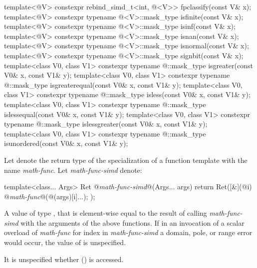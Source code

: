 \begin{itemdecl}
template<@\mathfloatingpoint@ V> constexpr rebind_simd_t<int, @\deducedsimd@<V>> fpclassify(const V& x);
template<@\mathfloatingpoint@ V> constexpr typename @\deducedsimd@<V>::mask_type isfinite(const V& x);
template<@\mathfloatingpoint@ V> constexpr typename @\deducedsimd@<V>::mask_type isinf(const V& x);
template<@\mathfloatingpoint@ V> constexpr typename @\deducedsimd@<V>::mask_type isnan(const V& x);
template<@\mathfloatingpoint@ V> constexpr typename @\deducedsimd@<V>::mask_type isnormal(const V& x);
template<@\mathfloatingpoint@ V> constexpr typename @\deducedsimd@<V>::mask_type signbit(const V& x);
template<class V0, class V1>
  constexpr typename @::mask_type isgreater(const V0& x, const V1& y);
template<class V0, class V1>
  constexpr typename @::mask_type isgreaterequal(const V0& x, const V1& y);
template<class V0, class V1>
  constexpr typename @::mask_type isless(const V0& x, const V1& y);
template<class V0, class V1>
  constexpr typename @::mask_type islessequal(const V0& x, const V1& y);
template<class V0, class V1>
  constexpr typename @::mask_type islessgreater(const V0& x, const V1& y);
template<class V0, class V1>
  constexpr typename @::mask_type isunordered(const V0& x, const V1& y);
\end{itemdecl}
\begin{itemdescr}
  \pnum
  Let  denote the return type of the specialization of a function template with the name
  \textit{math-func}.
  Let \textit{math-func-simd} denote:
  \begin{codeblock}
template<class... Args>
Ret @\textit{math-func-simd}@(Args... args) {
  return Ret([&](@\simdsizetype@ i) {
      @\textit{math-func}@(@(args)[i]...);
  });
}
  \end{codeblock}

  \pnum\returns
  A value  of type , that is element-wise equal to the result of calling
  \textit{math-func-simd} with the arguments of the above functions.
  If in an invocation of a scalar overload of \textit{math-func} for index  in
  \textit{math-func-simd} a domain, pole, or range error would occur, the value of  is
  unspecified.

  \pnum\remarks
  It is unspecified whether  () is accessed.
\end{itemdescr}


